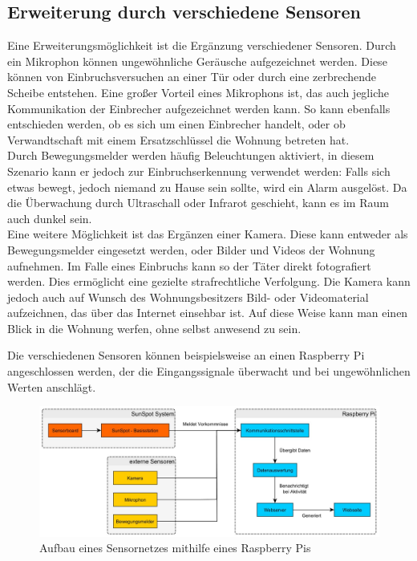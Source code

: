 \subsection{Erweiterung durch verschiedene Sensoren}\label{ss:sensoren}

Eine Erweiterungsmöglichkeit ist die Ergänzung verschiedener Sensoren. 
Durch ein Mikrophon können ungewöhnliche Geräusche aufgezeichnet werden. Diese können von Einbruchsversuchen an einer Tür oder durch eine zerbrechende Scheibe entstehen. Eine großer Vorteil eines Mikrophons ist, das auch jegliche Kommunikation der Einbrecher aufgezeichnet werden kann. So kann ebenfalls entschieden werden, ob es sich um einen Einbrecher handelt, oder ob Verwandtschaft mit einem Ersatzschlüssel die Wohnung betreten hat.\\

Durch Bewegungsmelder werden häufig Beleuchtungen aktiviert, in diesem Szenario kann er jedoch zur Einbruchserkennung verwendet werden: Falls sich etwas bewegt, jedoch niemand zu Hause sein sollte, wird ein Alarm ausgelöst. 
Da die Überwachung durch Ultraschall oder Infrarot geschieht, kann es im Raum auch dunkel sein.\\

Eine weitere Möglichkeit ist das Ergänzen einer Kamera. Diese kann entweder als Bewegungsmelder eingesetzt werden, oder Bilder und Videos der Wohnung aufnehmen. Im Falle eines Einbruchs kann so der Täter direkt fotografiert werden. Dies  ermöglicht eine gezielte strafrechtliche Verfolgung. Die Kamera kann jedoch auch auf Wunsch des Wohnungsbesitzers Bild- oder Videomaterial aufzeichnen, das über das Internet einsehbar ist. Auf diese Weise kann man einen Blick in die Wohnung werfen, ohne selbst anwesend zu sein.

Die verschiedenen Sensoren können beispielsweise an einen Raspberry Pi angeschlossen werden, der die Eingangssignale überwacht und bei ungewöhnlichen Werten anschlägt.

\begin{figure}[H] 
	\centering
	\includegraphics[scale=0.232]{Bilder/extSensor}
	\caption{Aufbau eines Sensornetzes mithilfe eines Raspberry Pis}
	\label{f:extSensor}
\end{figure}